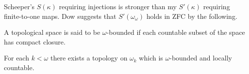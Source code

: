 \documentclass[11pt]{article}
\begin{document}
  \begin{remark}
    Scheeper's \(S(\kappa)\) requiring injections is stronger than my
    \(S'(\kappa)\) requiring finite-to-one maps. Dow suggests that
    \(S'(\omega_\omega)\) holds in ZFC by the following.
  \end{remark}

  \begin{definition}
    A topological space is said to be \(\omega\)-bounded if each countable
    subset of the space has compact closure.
  \end{definition}

  \begin{theorem}
    For each \(k<\omega\) there exists a topology on \(\omega_k\) which
    is \(\omega\)-bounded and locally countable.
  \end{theorem}
\end{document}
